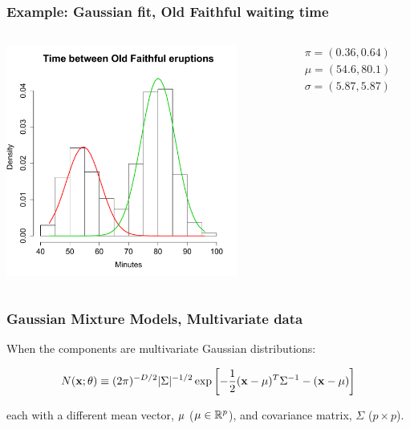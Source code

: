 \documentclass{beamer}
\begin{document}
\begin{frame}
  \frametitle{Example: Gaussian fit, Old Faithful waiting time}

\vspace*{-0.15in}
\begin{columns}
\begin{column}{7cm}
\begin{center}
\includegraphics[height=3in]{waiting-fit.pdf}  
\end{center}
\end{column}


\begin{column}{5cm}
\begin{eqnarray*}
\pi = (0.36, 0.64)\\
\mu = (54.6, 80.1)\\
\sigma = (5.87, 5.87) 
\end{eqnarray*}
\end{column}

\end{columns}



\end{frame}





\begin{frame}
  \frametitle{Gaussian Mixture Models, Multivariate data}

When the components are multivariate Gaussian distributions:

\[
N(\mathbf{x};\mathbf{\theta}) \equiv (2\pi)^{-D/2}|\Sigma|^{-1/2} \exp 
\left[
-\frac{1}{2}(\mathbf{x}-\mathbf{\mu})^{T} \Sigma^{-1} - (\mathbf{x}-\mathbf{\mu})
\right]
\]

each with a different mean vector, $\mathbf{\mu}$ ($\mathbf{\mu} \in \mathbb{R}^p$), and covariance matrix, $\Sigma$ ($p \times p$).

\end{frame}
\end{document}
